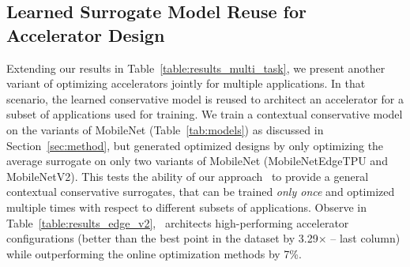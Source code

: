 \subsection{Learned Surrogate Model Reuse for Accelerator Design}
\label{app:additional_experiments_multi}
%
Extending our results in Table~\ref{table:results_multi_task}, we present another variant of optimizing accelerators jointly for multiple applications. In that scenario, the learned conservative model is reused to architect an accelerator for a subset of applications used for training. We train a contextual conservative model on the variants of MobileNet (Table~\ref{tab:models}) as discussed in Section~\ref{sec:method}, but generated optimized designs by only optimizing the average surrogate on only two variants of MobileNet (MobileNetEdgeTPU and MobileNetV2). This tests the ability of our approach \primemethodname\ to provide a general contextual conservative surrogates, that can be trained \textit{only once} and optimized multiple times with respect to different subsets of applications. Observe in Table~\ref{table:results_edge_v2}, \primemethodname\ architects high-performing accelerator configurations (better than the best point in the dataset by 3.29$\times$ -- last column) while outperforming the online optimization methods by 7\%.
%
\begin{table}[t!]
\small
\renewcommand{\arraystretch}{1.2}
\centering
\caption{Optimized objective values (i.e., latency in milliseconds) obtained by our \primemethodname\ when using the jointly optimized model on three variants of MobileNets and use for MobileNetEdgeTPU and MobileNetV2 for different dataset configurations. \primemethodname\ outperforms the best online method by \textbf{7\%} and finds an accelerator that is \textbf{3.29$\times$} better than the best accelerator in the training dataset (last row). The best accelerator configuration is highlighted in bold.}
\label{table:results_edge_v2}
\end{table}


